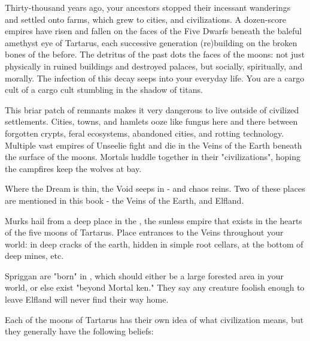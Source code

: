 

Thirty-thousand years ago, your ancestors stopped their incessant wanderings and settled onto farms, which grew to cities, and civilizations.  A dozen-score empires have risen and fallen on the faces of the Five Dwarfs beneath the baleful amethyst eye of Tartarus, each successive generation (re)building on the broken bones of the before.  The detritus of the past dots the faces of the moons: not just physically in ruined buildings and destroyed palaces, but socially, spiritually, and morally.  The infection of this decay seeps into your everyday life.  You are a cargo cult of a cargo cult stumbling in the shadow of titans.

This briar patch of remnants makes it very dangerous to live outside of civilized settlements.  Cities, towns, and hamlets ooze like fungus here and there between forgotten crypts, feral ecosystems, abandoned cities, and rotting technology. Multiple vast empires of Unseelie fight and die in the Veins of the Earth beneath the surface of the moons.  Mortals huddle together in their "civilizations", hoping the campfires keep the wolves at bay.

Where the Dream is thin, the Void seeps in - and chaos reins.  Two of these places are mentioned in this book - the Veins of the Earth, and Elfland.

Murks hail from a deep place in the , the sunless empire that exists in the hearts of the five moons of Tartarus. Place entrances to the Veins throughout your world: in deep cracks of the earth, hidden in simple root cellars, at the bottom of deep mines, etc. 


Spriggan are "born" in , which should either be a large forested area in your world, or else exist "beyond Mortal ken." They say any creature foolish enough to leave Elfland will never find their way home.


Each of the moons of Tartarus has their own idea of what civilization means, but they generally have the following beliefs:



